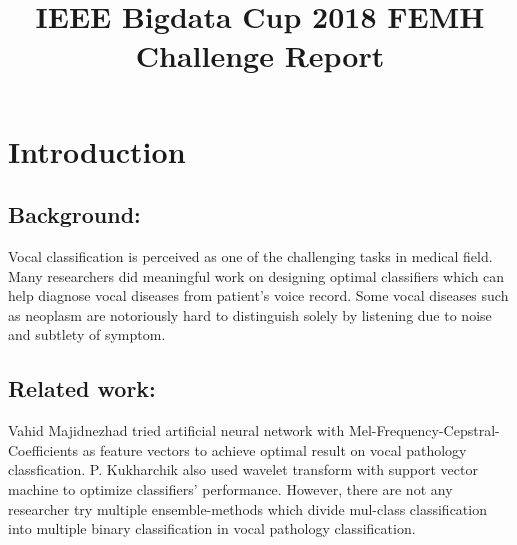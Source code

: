 \documentclass[conference]{IEEEtran}
\begin{document}
\title{IEEE Bigdata Cup 2018 FEMH Challenge Report\\
}

\author{
\and
{}
\and
{}
\and
{}
}

\maketitle

\section{Introduction}
\subsection{Background:}
	Vocal classification is perceived as one of the challenging tasks in medical field. Many researchers did meaningful work on designing optimal classifiers which can help diagnose vocal diseases from patient's voice record. Some vocal diseases such as neoplasm are notoriously hard to distinguish solely by listening due to noise and subtlety of symptom. 
\subsection{Related work:}
	Vahid Majidnezhad tried artificial neural network with Mel-Frequency-Cepstral-Coefficients as feature vectors to achieve optimal result on vocal pathology classfication\cite{b5}. P. Kukharchik also used wavelet transform with support vector machine to optimize classifiers' performance\cite{b4}. However, there are not any researcher try multiple ensemble-methods which divide mul-class classification into multiple binary classification in vocal pathology classification.
	
\end{document}
